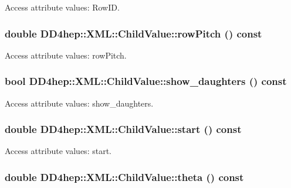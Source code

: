 Access attribute values: RowID. \hypertarget{struct_d_d4hep_1_1_x_m_l_1_1_child_value_a26817431b8cab9abd3f67e4ad53f7644}{
\subsubsection[{rowPitch}]{\setlength{\rightskip}{0pt plus 5cm}double DD4hep::XML::ChildValue::rowPitch () const}}
\label{struct_d_d4hep_1_1_x_m_l_1_1_child_value_a26817431b8cab9abd3f67e4ad53f7644}


Access attribute values: rowPitch. \hypertarget{struct_d_d4hep_1_1_x_m_l_1_1_child_value_ad970503872bffcc979c57b9faa5b8da5}{
\subsubsection[{show\_\-daughters}]{\setlength{\rightskip}{0pt plus 5cm}bool DD4hep::XML::ChildValue::show\_\-daughters () const}}
\label{struct_d_d4hep_1_1_x_m_l_1_1_child_value_ad970503872bffcc979c57b9faa5b8da5}


Access attribute values: show\_\-daughters. \hypertarget{struct_d_d4hep_1_1_x_m_l_1_1_child_value_ae3db07fc7382bee6cca13d3af5f709cb}{
\subsubsection[{start}]{\setlength{\rightskip}{0pt plus 5cm}double DD4hep::XML::ChildValue::start () const}}
\label{struct_d_d4hep_1_1_x_m_l_1_1_child_value_ae3db07fc7382bee6cca13d3af5f709cb}


Access attribute values: start. \hypertarget{struct_d_d4hep_1_1_x_m_l_1_1_child_value_af09e2214cf2a4d96728599e05867c985}{
\subsubsection[{theta}]{\setlength{\rightskip}{0pt plus 5cm}double DD4hep::XML::ChildValue::theta () const}}
\label{struct_d_d4hep_1_1_x_m_l_1_1_child_value_af09e2214cf2a4d96728599e05867c985}


